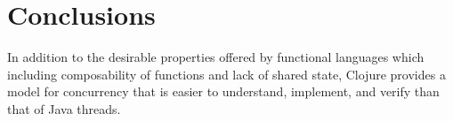 \section{Conclusions}
In addition to the desirable properties offered by functional languages which including composability of functions and lack of shared state, Clojure provides a model for concurrency that is easier to understand, implement, and verify than that of Java threads.  
